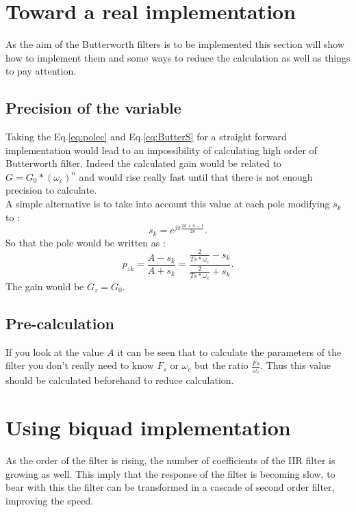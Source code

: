 \documentclass[twoside,twocolumn]{article}
\begin{document}
\section{Toward a real implementation}
As the aim of the Butterworth filters is to be implemented this section will show how to implement them and some ways to reduce the calculation as well as things to pay attention.
\subsection{Precision of the variable}
Taking the  Eq.\ref{eq:polec} and Eq.\ref{eq:ButterS}  for a straight forward implementation would lead to an impossibility of calculating high order of Butterworth filter. Indeed the calculated gain would be related to $G= G_0 * (\omega_c)^n$ and would rise really fast until that there is not enough precision to calculate.\\
A simple alternative is to take into account this value at each pole modifying $s_k$ to :
\begin{equation}
s_k= e^{j\pi\frac{2k+n-1}{2n}}.
\label{eq:polemodifc}
\end{equation}
So that the pole would be written as :
\begin{equation}
p_{zk}=\frac{A-s_k}{A+s_k}=\frac{\frac{2}{Ts*\omega_c}-s_k}{\frac{2}{Ts*\omega_c}+s_k}.
\end{equation} 
The gain would be $G_z=G_0$.\\

\subsection{Pre-calculation}
If you look at the value $A$ it can be seen that to calculate the parameters of the filter you don't really need to know $F_s$ or $\omega_c$ but the ratio $\frac{Fs}{\omega_c}$. Thus this value should be calculated beforehand to reduce calculation.
\section{Using biquad implementation}
As the order of the filter is rising, the number of coefficients of the IIR filter is growing as well. This imply that the response of the filter is becoming slow, to bear with this the filter can be transformed in a cascade of second order filter, improving the speed.\\
\end{document}
